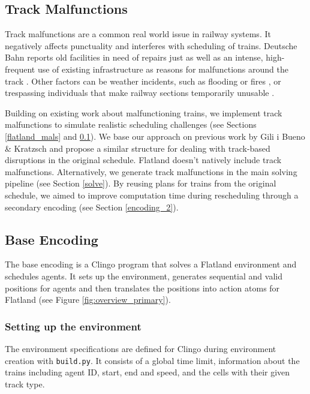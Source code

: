 \documentclass[runningheads]{llncs}
\begin{document}
\subsection{Track Malfunctions}
\label{trkmals}
Track malfunctions are a common real world issue in railway systems. It negatively affects punctuality and interferes with scheduling of trains. Deutsche Bahn reports old facilities in need of repairs just as well as an intense, high-frequent use of existing infrastructure as reasons for malfunctions around the track \cite{DB2025}. Other factors can be weather incidents, such as flooding \cite{AusPunctuality2025} or fires \cite{DB2025}, or trespassing individuals that make railway sections temporarily unusable \cite{SZdelayarticle2023}.

Building on existing work about malfunctioning trains, we implement \cite{TRailMix2026} track malfunctions to simulate realistic scheduling challenges (see Sections \ref{flatland_mals} and \ref{trkmals}). We base our approach on previous work by Gili i Bueno \& Kratzsch \cite{gilkra2025} and propose a similar structure for dealing with track-based disruptions in the original schedule. Flatland doesn't natively include track malfunctions. Alternatively, we generate track malfunctions in the main solving pipeline (see Section \ref{solve}). By reusing plans for trains from the original schedule,  we aimed to improve computation time during rescheduling through a secondary encoding (see Section \ref{encoding_2}).


\subsection{Base Encoding} \label{encoding_1}

The base encoding is a Clingo program that solves a Flatland environment and schedules agents. It sets up the environment, generates sequential and valid positions for agents and then translates the positions into action atoms for Flatland (see Figure \ref{fig:overview_primary}). 

\subsubsection{Setting up the environment} \label{setup_base}
The environment specifications are defined for Clingo during environment creation with \verb|build.py|. It consists of a global time limit, information about the trains including agent ID, start, end and speed, and the cells with their given track type.
\end{document}
